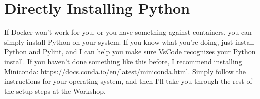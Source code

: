 \documentclass[12pt]{article}
\begin{document}
    \section{Directly Installing Python}

    If Docker won't work for you, or you have something against containers,
    you can simply install Python on your system.  If you know what you're
    doing, just install Python and Pylint, and I can help you make sure
    VsCode recognizes your Python install.  If you haven't done something
    like this before, I recommend installing Miniconda: \url{https://docs.conda.io/en/latest/miniconda.html}.
    Simply follow the instructions for your operating system, and then I'll take you
    through the rest of the setup steps at the Workshop.
\end{document}
